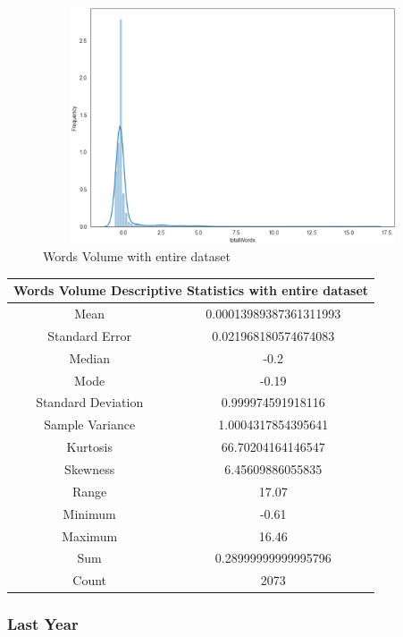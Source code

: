 \begin{figure}[h!]
    \centering
    \includegraphics[width=15cm,height=7cm,keepaspectratio]{resultsEvaluation/wordsDescMax.png}
    \caption{Words Volume with entire dataset}
    \label{fig:appendix_wordsDescMax}
\end{figure}
\begin{center}
\begin{tabular}{ c c }
\hline
\multicolumn{2}{|c|}{Words Volume Descriptive Statistics with entire dataset} \\
\hline
Mean & 0.00013989387361311993 \\
Standard Error & 0.021968180574674083 \\
Median & -0.2 \\
Mode & -0.19 \\
Standard Deviation & 0.999974591918116 \\
Sample Variance & 1.0004317854395641 \\
Kurtosis & 66.70204164146547 \\
Skewness & 6.45609886055835 \\
Range & 17.07 \\
Minimum & -0.61 \\
Maximum & 16.46 \\
Sum & 0.28999999999995796 \\
Count & 2073
\end{tabular}
\end{center}

\subsubsection{Last Year}

